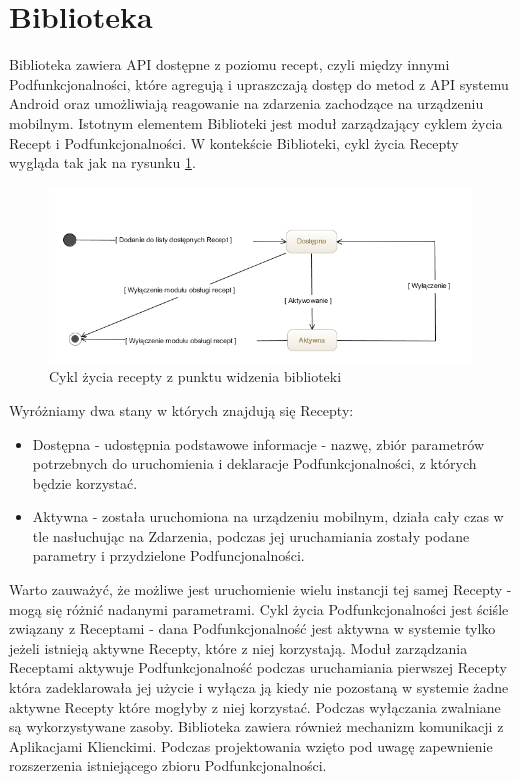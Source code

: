 \documentclass[11pt,a4paper,polish,thesis]{dcsbook}
\begin{document}
\section{Biblioteka}
Biblioteka zawiera API dostępne z poziomu recept, czyli między innymi Podfunkcjonalności, które agregują i upraszczają dostęp do metod z API systemu Android oraz umożliwiają reagowanie na zdarzenia zachodzące na urządzeniu mobilnym.
Istotnym elementem Biblioteki jest moduł zarządzający cyklem życia Recept i Podfunkcjonalności. W kontekście Biblioteki, cykl życia Recepty wygląda tak jak na rysunku
\ref{fig:cykl-zycia-recepty}.
\begin{figure}[H]
  \centering
  \includegraphics[scale=0.6]{./resources/cykl-zycia-recepty.jpg}
  \caption{Cykl życia recepty z punktu widzenia biblioteki}
  \label{fig:cykl-zycia-recepty}
\end{figure}
Wyróżniamy dwa stany w których znajdują się Recepty:
\begin{itemize}
\item Dostępna - udostępnia podstawowe informacje - nazwę, zbiór parametrów potrzebnych do uruchomienia i deklaracje Podfunkcjonalności, z których będzie korzystać.
\item Aktywna - została uruchomiona na urządzeniu mobilnym, działa cały czas w tle nasłuchując na Zdarzenia, podczas jej uruchamiania zostały podane parametry i przydzielone Podfuncjonalności.
\end{itemize}
Warto zauważyć, że możliwe jest uruchomienie wielu instancji tej samej Recepty - mogą się różnić nadanymi parametrami.
Cykl życia Podfunkcjonalności jest ściśle związany z Receptami - dana Podfunkcjonalność jest aktywna w systemie tylko jeżeli istnieją aktywne Recepty, które z niej korzystają. 
Moduł zarządzania Receptami aktywuje Podfunkcjonalność podczas uruchamiania pierwszej Recepty która zadeklarowała jej użycie i wyłącza ją kiedy nie pozostaną w systemie żadne aktywne Recepty które mogłyby z niej korzystać.
Podczas wyłączania zwalniane są wykorzystywane zasoby. Biblioteka zawiera również mechanizm komunikacji z Aplikacjami Klienckimi. Podczas projektowania wzięto pod uwagę zapewnienie rozszerzenia istniejącego zbioru Podfunkcjonalności.
\end{document}
